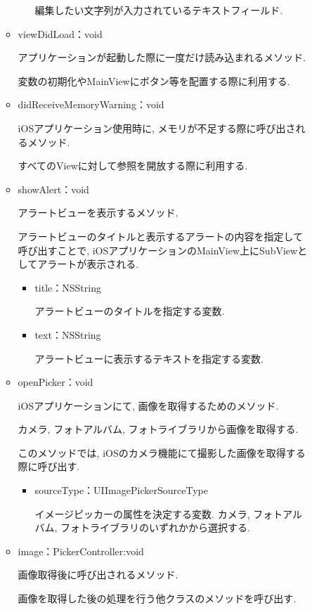 \begin{description}
\begin{itemize}
\begin{itemize}
\begin{itemize}
編集したい文字列が入力されているテキストフィールド.
\end{itemize}

\item viewDidLoad：void

アプリケーションが起動した際に一度だけ読み込まれるメソッド.

変数の初期化やMainViewにボタン等を配置する際に利用する.

\item didReceiveMemoryWarning：void

iOSアプリケーション使用時に, メモリが不足する際に呼び出されるメソッド.

すべてのViewに対して参照を開放する際に利用する.

\item showAlert：void

アラートビューを表示するメソッド.

アラートビューのタイトルと表示するアラートの内容を指定して呼び出すことで, iOSアプリケーションのMainView上にSubViewとしてアラートが表示される.

\begin{itemize}
\item title：NSString

アラートビューのタイトルを指定する変数.

\item text：NSString

アラートビューに表示するテキストを指定する変数.
\end{itemize}

\item openPicker：void

iOSアプリケーションにて, 画像を取得するためのメソッド.

カメラ, フォトアルバム, フォトライブラリから画像を取得する.

このメソッドでは, iOSのカメラ機能にて撮影した画像を取得する際に呼び出す.

\begin{itemize}
\item sourceType：UIImagePickerSourceType

イメージピッカーの属性を決定する変数.
カメラ, フォトアルバム, フォトライブラリのいずれかから選択する.
\end{itemize}

\item image：PickerController:void

画像取得後に呼び出されるメソッド.

画像を取得した後の処理を行う他クラスのメソッドを呼び出す.


\end{itemize}
\end{itemize}
\end{description}
